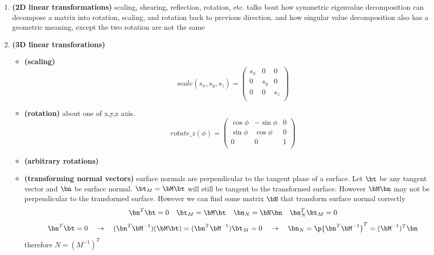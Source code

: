 \documentclass[11pt]{article}
\newcommand{\bheading}[1]{\textbf{(#1)}}
\begin{document}
\begin{enumerate}
    \item \bheading{2D linear transformations} scaling, shearing, reflection, rotation, etc. talks bout how symmetric eigenvalue decomposition can decompose a matrix into rotation, scaling, and rotation back to previous direction. and how singular value decomposition also has a geometric meaning, except the two rotation are not the same
    \item \bheading{3D linear transforations}
    \begin{itemize}
        \item \bheading{scaling}
        \[
            scale(s_x,s_y,s_z) = 
            \begin{pmatrix}
                s_x & 0 & 0 \\ 
                0 & s_y & 0 \\
                0 & 0 & s_z \\
            \end{pmatrix}  
        \]
        \item \bheading{rotation} about one of x,y,z axis.
        \[
            rotate\_z(\phi) = 
            \begin{pmatrix}
                \cos \phi & -\sin \phi & 0 \\
                \sin \phi & \cos \phi & 0 \\
                0 & 0 & 1 \\
            \end{pmatrix}
        \]
        \item \bheading{arbitrary rotations}
        \item \bheading{transforming normal vectors} surface normals are perpendicular to the tangent plane of a surface. Let $\bt$ be any tangent vector and $\bn$ be surface normal. $\bt_M = \bM\bt$ will still be tangent to the transformed surface. However $\bM\bn$ may not be perpendicular to the transformed surface. However we can find some matrix $\bN$ that transform surface normal correctly
        \[
            \bn^T \bt = 0 
            \quad
            \bt_M = \bM\bt
            \quad
            \bn_N = \bN\bn
            \quad
            \bn_N^T \bt_M = 0
        \]
        \[
            \bn^T \bt = 0 
            \quad\rightarrow\quad 
            (\bn^T \bM^{-1})(\bM \bt) = (\bn^T\bM^{-1})\bt_M = 0
            \quad\rightarrow\quad 
            \bn_N = \p{\bn^T \bM^{-1}}^T = (\bM^{-1})^T \bn
        \]
        therefore $N = (M^{-1})^T$
    \end{itemize}

\end{enumerate}
\end{document}
